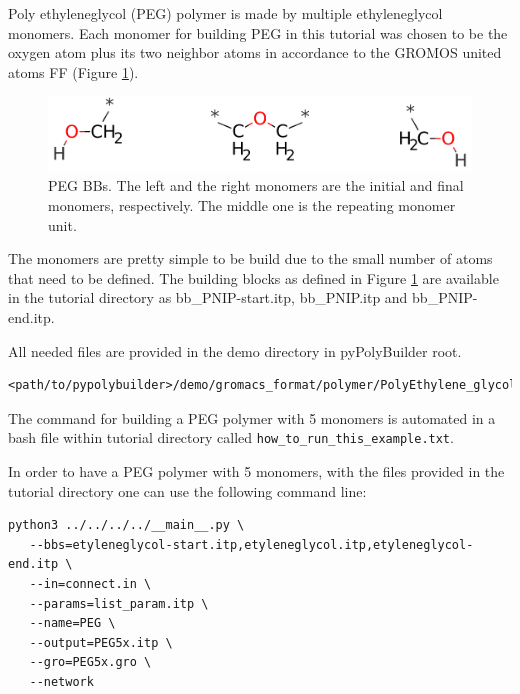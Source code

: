
Poly ethyleneglycol (PEG) polymer is made by multiple ethyleneglycol monomers.
Each monomer for building PEG in this tutorial was chosen to be the oxygen atom plus its two neighbor atoms in accordance to the GROMOS united atoms FF (Figure \ref{fig:PEGBBs}).

\begin{figure}
    \centering
    \includegraphics[width=\textwidth]{PEG/PEGBBs.png}
    \caption{PEG BBs. The left and the right monomers are the initial and final monomers, respectively.
            The middle one is the repeating monomer unit.}
    \label{fig:PEGBBs}
\end{figure}

The monomers are pretty simple to be build due to the small number of atoms that need to be defined.
The building blocks as defined in Figure \ref{fig:PEGBBs} are available in the tutorial directory as bb\_PNIP-start.itp, bb\_PNIP.itp and bb\_PNIP-end.itp.

All needed files are provided in the demo directory in pyPolyBuilder root.
\begin{lstlisting}
<path/to/pypolybuilder>/demo/gromacs_format/polymer/PolyEthylene_glycol
\end{lstlisting}

The command for building a PEG polymer with 5 monomers is automated in a bash file within tutorial directory called \texttt{how\_to\_run\_this\_example.txt}.

In order to have a PEG polymer with 5 monomers, with the files provided in the tutorial directory one can use the following command line:

\begin{lstlisting}
python3 ../../../../__main__.py \
   --bbs=etyleneglycol-start.itp,etyleneglycol.itp,etyleneglycol-end.itp \
   --in=connect.in \
   --params=list_param.itp \
   --name=PEG \
   --output=PEG5x.itp \
   --gro=PEG5x.gro \
   --network
\end{lstlisting}

